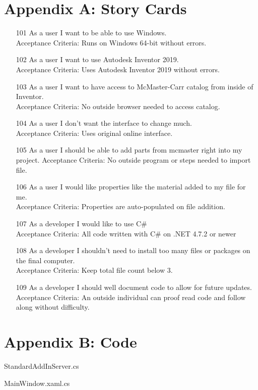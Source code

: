 \documentclass[12pt, letterpaper]{article}
\begin{document}
\section{Appendix A: Story Cards}
\begin{itemize}
    \item [101] As a user I want to be able to use Windows.\\
    Acceptance Criteria: Runs on Windows 64-bit without errors.
    \item [102] As a user I want to use Autodesk Inventor 2019.\\
    Acceptance Criteria: Uses Autodesk Inventor 2019 without errors.
    \item [103] As a user I want to have access to McMaster-Carr catalog from inside of Inventor.\\
    Acceptance Criteria: No outside browser needed to access catalog.
    \item [104] As a user I don't want the interface to change much.\\
    Acceptance Criteria: Uses original online interface.
    \item [105] As a user I should be able to add parts from mcmaster right into my project.
    Acceptance Criteria: No outside program or steps needed to import file.
    \item [106] As a user I would like properties like the material added to my file for me.\\
    Acceptance Criteria: Properties are auto-populated on file addition.
    \item [107] As a developer I would like to use C\# \\
    Acceptance Criteria: All code written with C\# on .NET 4.7.2 or newer
    \item [108] As a developer I shouldn't need to install too many files or packages on the final computer.\\
    Acceptance Criteria: Keep total file count below 3.
    \item [109] As a developer I should well document code to allow for future updates.\\
    Acceptance Criteria: An outside individual can proof read code and follow along without difficulty.
\end{itemize}



\newpage
\section{Appendix B: Code}
StandardAddInServer.cs
\lstset{style=sharpc}

\newpage
MainWindow.xaml.cs

\end{document}

